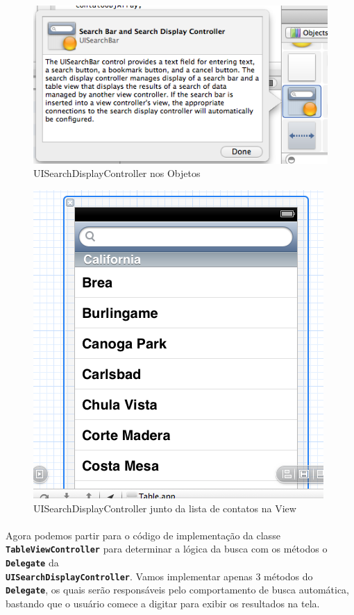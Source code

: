 \documentclass[a4paper,12pt,brazil,doubleside]{book}
\begin{document}
\begin{singlespace}
\begin{figure}[H]
  \centering
  \includegraphics[totalheight=0.3\textheight]{figuras/table/table2.png}
  \caption{UISearchDisplayController nos Objetos}
  \label{fig:a}
\end{figure}

\bigskip

\begin{figure}[H]
  \centering
  \includegraphics[totalheight=0.45\textheight]{figuras/table/table1.png}
  \caption{UISearchDisplayController junto da lista de contatos na View}
  \label{fig:a}
\end{figure}

\bigskip

\paragraph{}Agora podemos partir para o código de implementação da classe \texttt{\textbf{TableViewController}} para determinar a lógica da busca com os métodos o \texttt{\textbf{Delegate}} da\\
\texttt{\textbf{UISearchDisplayController}}. Vamos implementar apenas 3 métodos do \texttt{\textbf{Delegate}}, os quais serão responsáveis pelo comportamento de busca automática, bastando que o usuário comece a digitar para exibir os resultados na tela.


\end{singlespace}
\end{document}
